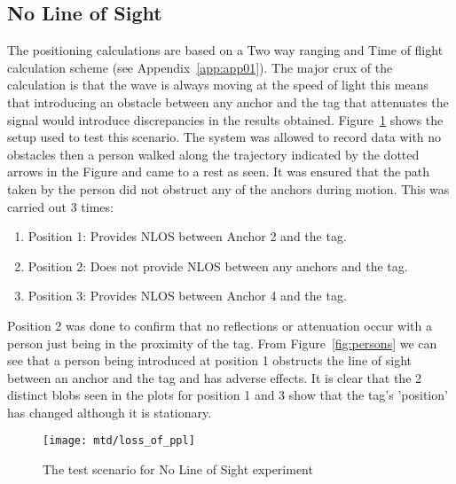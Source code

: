 \subsection{No Line of Sight}\label{subsec:no-line-of-sight}
The positioning calculations are based on a Two way ranging and Time of flight calculation scheme (see Appendix~\ref{app:app01}).
The major crux of the calculation is that the wave is always moving at the speed of light this means that introducing an obstacle between any anchor and the tag that attenuates the signal would introduce discrepancies in the results obtained.
Figure~\ref{fig:nlos} shows the setup used to test this scenario.
The system was allowed to record data with no obstacles then a person walked along the trajectory indicated by the dotted arrows in the Figure and came to a rest as seen.
It was ensured that the path taken by the person did not obstruct any of the anchors during motion.
This was carried out 3 times:
\begin{enumerate}
    \item Position 1: Provides NLOS between Anchor 2 and the tag.
    \item Position 2: Does not provide NLOS between any anchors and the tag.
    \item Position 3: Provides NLOS between Anchor 4 and the tag.
\end{enumerate}
Position 2 was done to confirm that no reflections or attenuation occur with a person just being in the proximity of the tag.
From Figure~\ref{fig:persons} we can see that a person being introduced at position 1 obstructs the line of sight between an anchor and the tag and has adverse effects.
It is clear that the 2 distinct blobs seen in the plots for position 1 and 3 show that the tag's 'position' has changed although it is stationary.

\begin{figure}[h!]
    \centering
    \texttt{[image: mtd/loss\_of\_ppl]}
    \caption{The test scenario for No Line of Sight experiment}
    \label{fig:nlos}
\end{figure}

